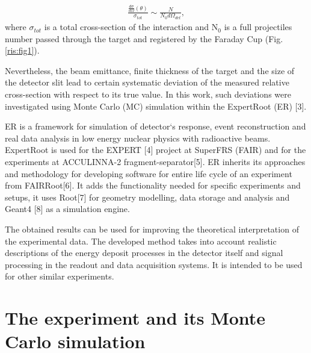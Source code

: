 \documentclass[%
 aip,
cp,  %
 amsmath,amssymb,%
 reprint,%
]{revtex4-2}
\begin{document}
\begin{eqnarray}
 \frac{ \frac{d\sigma}{d\Omega}(\theta) }{\sigma_{tot}} \sim \frac{N}{N_0 d\Omega_{det}},
\end{eqnarray}
where
$\sigma$$_{tot}$ is a total cross-section of the interaction
and N$_{0}$ is a full projectiles number passed through the target and registered by the Faraday Cup (Fig. \ref{ris:fig1}).

Nevertheless, the beam emittance, finite thickness of the target and the size of the detector slit lead to certain systematic deviation of the measured relative cross-section with respect to its true value. In this work, such deviations were investigated using Monte Carlo (MC) simulation within the ExpertRoot (ER) [3].

ER is a framework for simulation of detector`s response, event reconstruction and real data analysis in low energy nuclear physics with radioactive beams. ExpertRoot is used for the EXPERT [4] project at SuperFRS (FAIR) and for the experiments at ACCULINNA-2 fragment-separator[5].  ER inherits its approaches and methodology for developing software for entire life cycle of an experiment from FAIRRoot[6]. It adds the functionality needed for specific experiments and setups, it uses Root[7] for geometry modelling, data storage and analysis and Geant4 [8] as a simulation engine.

The obtained results can be used for improving the theoretical interpretation of the experimental data. The developed method takes into account realistic descriptions of the energy deposit processes in the detector itself and signal processing in the readout and data acquisition systems. It is intended to be used for other similar experiments.

\section{The experiment and its Monte Carlo simulation}
\end{document}
